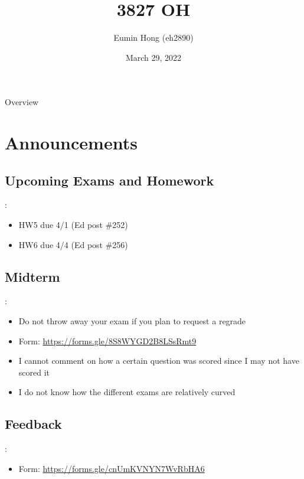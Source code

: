 \documentclass{../slides}
\title{3827 OH}
\author{Eumin Hong (eh2890)}
\institute{Columbia University}
\date{March 29, 2022}
\begin{document}
\begin{frame}
    \titlepage
\end{frame}

\begin{frame}{Overview}
\begin{multicols}{2}
\tableofcontents
\end{multicols}
\end{frame}

\section{Announcements}
\subsection{Upcoming Exams and Homework}
\begin{frame}{\secname: \subsecname}
    \begin{itemize}
        \item HW5 due 4/1 (Ed post \#252)
        \item HW6 due 4/4 (Ed post \#256)
    \end{itemize}
\end{frame}

\subsection{Midterm}
\begin{frame}{\secname: \subsecname}
    \begin{itemize}
        \item Do not throw away your exam if you plan to request a regrade
        \item Form: \url{https://forms.gle/8S8WYGD2B8LSsRmt9}
        \item I cannot comment on how a certain question was scored since I may not have scored it
        \item I do not know how the different exams are relatively curved
    \end{itemize}
\end{frame}

\subsection{Feedback}
\begin{frame}{\secname: \subsecname}
    \begin{itemize}
        \item Form: \url{https://forms.gle/cnUmKVNYN7WvRbHA6}
    \end{itemize}
\end{frame}
\end{document}
